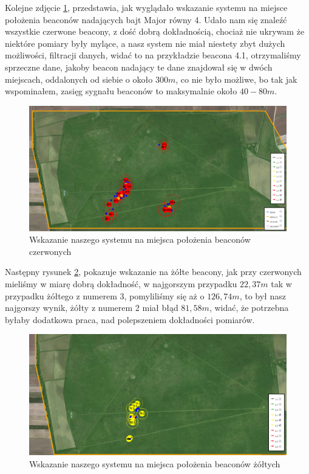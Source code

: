 Kolejne zdjęcie \ref{fig:wskazanieczerwone}, przedstawia, jak wyglądało wskazanie systemu na miejsce położenia beaconów nadających bajt Major równy 4. Udało nam się znaleźć wszystkie czerwone beacony, z dość dobrą dokładnością, chociaż nie ukrywam że niektóre pomiary były mylące, a nasz system nie miał niestety zbyt dużych możliwości, filtracji danych, widać to na przykładzie beacona 4.1, otrzymaliśmy sprzeczne dane, jakoby beacon nadający te dane znajdował się w dwóch miejscach, oddalonych od siebie o około $300 m$, co nie było możliwe, bo tak jak wspominałem, zasięg sygnału beaconów to maksymalnie około $40-80 m$.

\begin{figure}[!th]
    \centering
    \includegraphics[width=15cm]{zalaczniki/obrazy/wskazanie_czerwone.png}
    \caption{Wskazanie naszego systemu na miejsca położenia beaconów czerwonych}
    \label{fig:wskazanieczerwone}
\end{figure}

Następny rysunek \ref{fig:wskazaniezolte}, pokazuje wskazanie na żółte beacony, jak przy czerwonych mieliśmy w miarę dobrą dokładność, w najgorszym przypadku $22,37 m$ tak w przypadku żółtego z numerem 3, pomyliliśmy się aż o $126,74 m$, to był nasz najgorszy wynik, żółty z numerem 2 miał błąd $81,58 m$, widać, że potrzebna byłaby dodatkowa praca, nad polepszeniem dokładności pomiarów.

\begin{figure}[!th]
    \centering
    \includegraphics[width=15cm]{zalaczniki/obrazy/wskazanie_zolte.png}
    \caption{Wskazanie naszego systemu na miejsca położenia beaconów żółtych}
    \label{fig:wskazaniezolte}
\end{figure}

